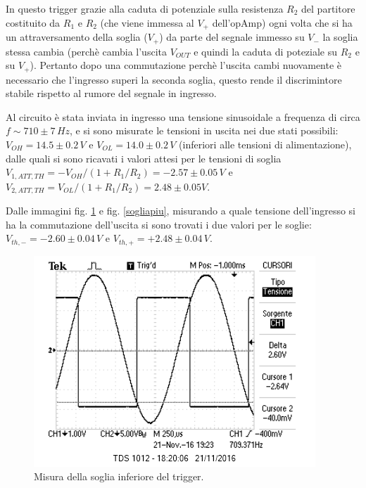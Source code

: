 \documentclass[10pt,a4paper]{article}
\begin{document}
In questo trigger grazie alla caduta di potenziale sulla resistenza $R_2$ del partitore costituito da $R_1$ e $R_2$ (che viene immessa al $V_{+}$ dell'opAmp) ogni volta che si ha un attraversamento della soglia ($V_{+}$) da parte del segnale immesso su $V_{-}$ la soglia stessa cambia (perchè cambia l'uscita $V_{OUT}$ e quindi la caduta di poteziale su $R_2$ e su $V_{+}$). Pertanto dopo una commutazione perchè l'uscita cambi nuovamente è necessario che l'ingresso superi la seconda soglia, questo rende il discrimintore stabile rispetto al rumore del segnale in ingresso.

Al circuito è stata inviata in ingresso una tensione sinusoidale a frequenza di circa $f \sim 710 \pm 7 \, Hz$, e si sono misurate le tensioni in uscita nei due stati possibili: $V_{OH} = 14.5\pm 0.2 \, V$ e $V_{OL} = 14.0\pm0.2 \, V$ (inferiori alle tensioni di alimentazione), dalle quali si sono ricavati i valori attesi per le tensioni di soglia $V_{1,ATT,TH}= -V_{OH}/(1+R_1/R_2)= -2.57 \pm 0.05 \, V$ e $V_{2,ATT,TH}= V_{OL}/(1+R_1/R_2) = 2.48 \pm 0.05 V$. 

Dalle immagini fig. \ref{sogliameno} e fig. \ref{sogliapiu}, misurando a quale tensione dell'ingresso si ha la commutazione dell'uscita si sono trovati i due valori per le soglie: $V_{th, -} =-2.60 \pm 0.04 \, V $ e $V_{th, +} = +2.48 \pm 0.04 \, V$.

\begin{figure}[htb!]
\centering
\includegraphics[scale=1.0]{immagini/FotoRicordoVth1.png}
\caption{Misura della soglia inferiore del trigger.}
\label{sogliameno}
\end{figure}
\end{document}
